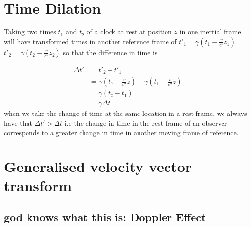 \section{Time Dilation}

Taking two times $t_1$ and $t_2$ of a clock at rest at position $z$ in one inertial frame will have transformed times in another reference frame of $t'_1 = \gamma(t_1 - \frac{v}{c^2}z_1)$ $t'_2 = \gamma(t_2 - \frac{v}{c^2}z_2)$ so that the difference in time is

\begin{equation}%
\begin{split}
   \Delta t' &=  t'_2 - t'_1 \\ &= \gamma(t_2 - \frac{v}{c^2}z) - \gamma(t_1 - \frac{v}{c^2}z) \\ &= \gamma (t_2 - t_1 ) \\ &= \gamma \Delta t
\end{split}
\end{equation}%
when we take the change of time at the same location in a rest frame, we always have that $\Delta t' > \Delta t$ i.e the change in time in the rest frame of an observer corresponds to a greater change in time in another moving frame of reference.

\section{Generalised velocity vector transform}
\subsection{god knows what this is: Doppler Effect}

